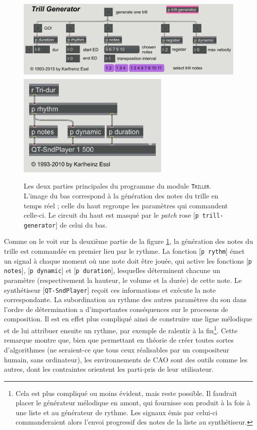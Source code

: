 \documentclass[a4paper,12pt]{article}
\newcommand{\module}[1]{\texttt{\textsc{#1}}}
\newcommand{\patch}[1]{[\texttt{#1}]}
\begin{document}
\begin{figure}[!h]
\begin{center}
\includegraphics[height=4cm]{images/triller1.jpg} \\ \bigskip 
\includegraphics[height=5cm]{images/triller2.jpg}
\caption{\footnotesize Les deux parties principales du programme du module \module{Triller}. L'image du bas correspond à la génération des notes du trille en temps réel ; celle du haut regroupe les paramètres qui commandent celle-ci. Le circuit du haut est masqué par le \emph{patch} rose \patch{p trill-generator} de celui du bas.}
\label{trillermain}
\end{center}
\end{figure}

Comme on le voit sur la deuxième partie de la figure \ref{trillermain}, la génération des notes du trille est commandée en premier lieu par le rythme. La fonction \patch{p rythm} émet un signal à chaque moment où une note doit être jouée, qui active les fonctions \patch{p notes}, \patch{p dynamic} et \patch{p duration}, lesquelles déterminent chacune un paramètre (respectivement la hauteur, le volume et la durée) de cette note. 	Le synthétiseur \patch{QT-SndPlayer} reçoit ces informations et exécute la note correspondante. La subordination au rythme des autres paramètres du son dans l'ordre de détermination a d'importantes conséquences sur le processus de composition. Il est en effet plus compliqué ainsi de construire une ligne mélodique et de lui attribuer ensuite un rythme, par exemple de ralentir à la fin\footnote{Cela est plus compliqué ou moins évident, mais reste possible. Il faudrait placer le générateur mélodique en amont, qui fournisse son produit à la fois à une liste et au générateur de rythme. Les signaux émis par celui-ci commanderaient alors l'envoi progressif des notes de la liste au synthétiseur.}. Cette remarque montre que, bien que permettant en théorie de créer toutes sortes d'algorithmes (ne seraient-ce que tous ceux réalisables par un compositeur humain, sans ordinateur), les environnements de CAO sont des outils comme les autres, dont les contraintes orientent les parti-pris de leur utilisateur.
\end{document}
